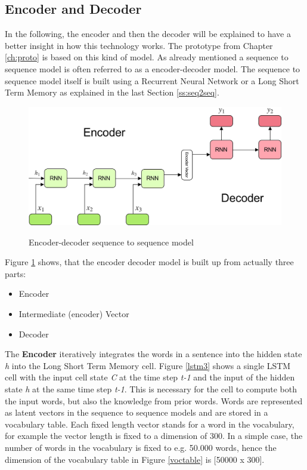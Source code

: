 \subsection{Encoder and Decoder}

In the following, the encoder and then the decoder will be explained to have a better insight in how this technology works. The prototype from Chapter \ref{ch:proto} is based on this kind of model. As already mentioned a sequence to sequence model is often referred to as a encoder-decoder model. The sequence to sequence model itself is built using a Recurrent Neural Network or a Long Short Term Memory as explained in the last Section \ref{ss:seq2seq}.

\begin{figure}
	\begin{center}
		\includegraphics[width=4.5in]{photos/encoderdecoder.jpeg}\\
		\caption{Encoder-decoder sequence to sequence model \cite{encdec}}\label{encdecseq}
	\end{center}
\end{figure}

Figure \ref{encdecseq} shows, that the encoder decoder model is built up from actually three parts:

\begin{itemize}
	\item Encoder
	\item Intermediate (encoder) Vector
	\item Decoder
\end{itemize}


The \textbf{Encoder} iteratively integrates the words in a sentence into the hidden state \textit{h} into the Long Short Term Memory cell.
Figure \ref{lstm3} shows a single LSTM cell with the input cell state \textit{C} at the time step \textit{t-1}  and the input of the hidden state \textit{h} at the same time step \textit{t-1}. This is necessary for the cell to compute both the input words, but also the knowledge from prior words. Words are represented as latent vectors in the sequence to sequence models and are stored in a vocabulary table. Each fixed length vector stands for a word in the vocabulary, for example the vector length is fixed to a dimension of 300. In a simple case, the number of words in the vocabulary is fixed to e.g. 50.000 words, hence the dimension of the vocabulary table in Figure \ref{voctable} is [50000 x 300]. 

